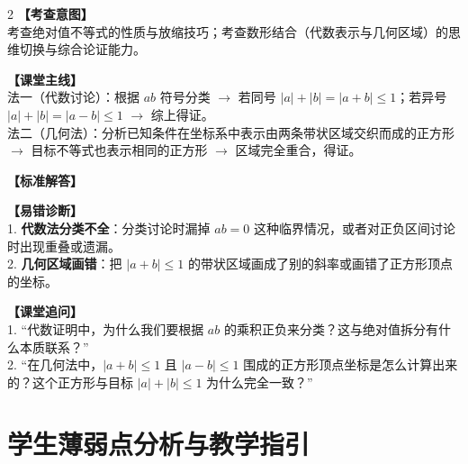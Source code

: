 \documentclass[11pt,a4paper]{ctexart}
\begin{document}
\begin{paracol}{2}
  \textbf{【考查意图】}\\
  考查绝对值不等式的性质与放缩技巧；考查数形结合（代数表示与几何区域）的思维切换与综合论证能力。
  
  \textbf{【课堂主线】}\\
  法一（代数讨论）：根据 \(ab\) 符号分类 \(\to\) 若同号 \(|a|+|b|=|a+b| \leqslant 1\)；若异号 \(|a|+|b|=|a-b| \leqslant 1\) \(\to\) 综上得证。\\
  法二（几何法）：分析已知条件在坐标系中表示由两条带状区域交织而成的正方形 \(\to\) 目标不等式也表示相同的正方形 \(\to\) 区域完全重合，得证。
  
  \textbf{【标准解答】}\\
  \qEightSolution

  \switchcolumn
  \textbf{【易错诊断】}\\
  1. \textbf{代数法分类不全}：分类讨论时漏掉 \(ab=0\) 这种临界情况，或者对正负区间讨论时出现重叠或遗漏。\\
  2. \textbf{几何区域画错}：把 \(|a+b| \leqslant 1\) 的带状区域画成了别的斜率或画错了正方形顶点的坐标。
  
  \textbf{【课堂追问】}\\
  1. “代数证明中，为什么我们要根据 \(ab\) 的乘积正负来分类？这与绝对值拆分有什么本质联系？”\\
  2. “在几何法中，\(|a+b| \leqslant 1\) 且 \(|a-b| \leqslant 1\) 围成的正方形顶点坐标是怎么计算出来的？这个正方形与目标 \(|a|+|b| \leqslant 1\) 为什么完全一致？”
\end{paracol}

\vspace{0.8em}
\par{}
\vspace{0.8em}

\newpage

\section{学生薄弱点分析与教学指引}

\begingroup
\linespread{1.4}\selectfont
\end{document}
